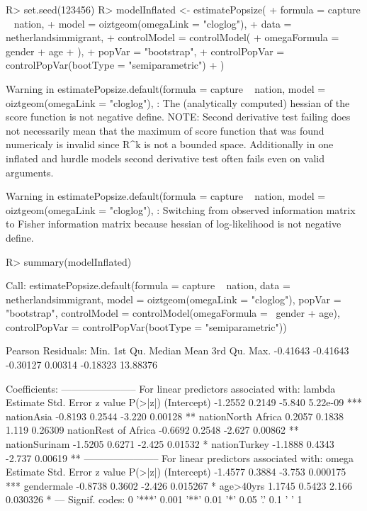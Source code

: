 \documentclass[
]{jss}
\newcommand{\1}{\mathcal{I}} \newcommand{\bx}{\boldsymbol{x}}
\begin{document}
\begin{CodeChunk}
\begin{CodeInput}
R> set.seed(123456)
R> modelInflated <- estimatePopsize(
+     formula = capture ~ nation,
+     model   = oiztgeom(omegaLink = "cloglog"),
+     data    = netherlandsimmigrant,
+     controlModel = controlModel(
+         omegaFormula = ~ gender + age
+     ),
+     popVar = "bootstrap",
+     controlPopVar = controlPopVar(bootType = "semiparametric")
+ )
\end{CodeInput}
\begin{CodeOutput}
Warning in estimatePopsize.default(formula = capture ~ nation, model = oiztgeom(omegaLink = "cloglog"), : The (analytically computed) hessian of the score function is not negative define.
NOTE: Second derivative test failing does not 
        necessarily mean that the maximum of score function that was found 
        numericaly is invalid since R^k is not a bounded space.
Additionally in one inflated and hurdle models second derivative test often fails even on valid arguments.
\end{CodeOutput}
\begin{CodeOutput}
Warning in estimatePopsize.default(formula = capture ~ nation, model =
oiztgeom(omegaLink = "cloglog"), : Switching from observed information matrix
to Fisher information matrix because hessian of log-likelihood is not negative
define.
\end{CodeOutput}
\begin{CodeInput}
R> summary(modelInflated)
\end{CodeInput}
\begin{CodeOutput}

Call:
estimatePopsize.default(formula = capture ~ nation, data = netherlandsimmigrant, 
    model = oiztgeom(omegaLink = "cloglog"), popVar = "bootstrap", 
    controlModel = controlModel(omegaFormula = ~gender + age), 
    controlPopVar = controlPopVar(bootType = "semiparametric"))

Pearson Residuals:
    Min.  1st Qu.   Median     Mean  3rd Qu.     Max. 
-0.41643 -0.41643 -0.30127  0.00314 -0.18323 13.88376 

Coefficients:
-----------------------
For linear predictors associated with: lambda 
                     Estimate Std. Error z value  P(>|z|)    
(Intercept)           -1.2552     0.2149  -5.840 5.22e-09 ***
nationAsia            -0.8193     0.2544  -3.220  0.00128 ** 
nationNorth Africa     0.2057     0.1838   1.119  0.26309    
nationRest of Africa  -0.6692     0.2548  -2.627  0.00862 ** 
nationSurinam         -1.5205     0.6271  -2.425  0.01532 *  
nationTurkey          -1.1888     0.4343  -2.737  0.00619 ** 
-----------------------
For linear predictors associated with: omega 
            Estimate Std. Error z value  P(>|z|)    
(Intercept)  -1.4577     0.3884  -3.753 0.000175 ***
gendermale   -0.8738     0.3602  -2.426 0.015267 *  
age>40yrs     1.1745     0.5423   2.166 0.030326 *  
---
Signif. codes:  0 '***' 0.001 '**' 0.01 '*' 0.05 '.' 0.1 ' ' 1


\end{CodeOutput}
\end{CodeChunk}
\end{document}
